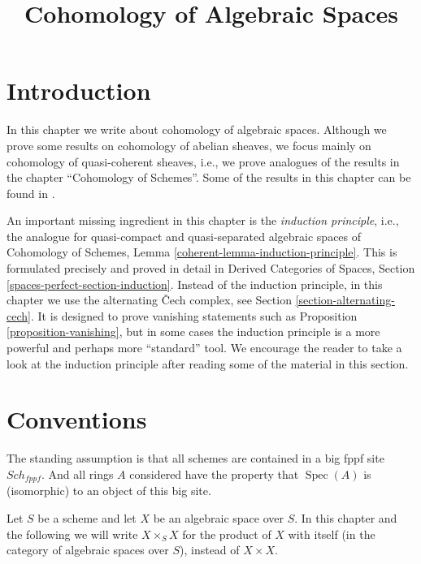 \documentclass{stacks-project}
\theoremstyle{plain}
\theoremstyle{definition}
\theoremstyle{remark}
\numberwithin{equation}{subsection}
\def\Spec{\mathop{\mathrm{Spec}}}
\def\Sch{\mathit{Sch}}
\begin{document}
\title{Cohomology of Algebraic Spaces}

\maketitle

\label{section-phantom}

\tableofcontents




\section{Introduction}
\label{section-introduction}

\noindent
In this chapter we write about cohomology of algebraic spaces.
Although we prove some results on cohomology of abelian sheaves,
we focus mainly on cohomology of quasi-coherent sheaves, i.e.,
we prove analogues of the results in the chapter ``Cohomology of Schemes''.
Some of the results in this chapter can be found in \cite{Kn}.

\medskip\noindent
An important missing ingredient in this chapter is the
{\it induction principle}, i.e., the analogue for quasi-compact
and quasi-separated algebraic spaces of
Cohomology of Schemes, Lemma \ref{coherent-lemma-induction-principle}.
This is formulated precisely and proved in detail in
Derived Categories of Spaces, Section \ref{spaces-perfect-section-induction}.
Instead of the induction principle, in this chapter we use the
alternating {\v C}ech complex, see
Section \ref{section-alternating-cech}.
It is designed to prove vanishing statements such as
Proposition \ref{proposition-vanishing},
but in some cases the induction principle is a more powerful
and perhaps more ``standard'' tool. We encourage the reader
to take a look at the induction principle
after reading some of the material in this section.



\section{Conventions}
\label{section-conventions}

\noindent
The standing assumption is that all schemes are contained in
a big fppf site $\Sch_{fppf}$. And all rings $A$ considered
have the property that $\Spec(A)$ is (isomorphic) to an
object of this big site.

\medskip\noindent
Let $S$ be a scheme and let $X$ be an algebraic space over $S$.
In this chapter and the following we will write $X \times_S X$
for the product of $X$ with itself (in the category of algebraic
spaces over $S$), instead of $X \times X$.
\end{document}
